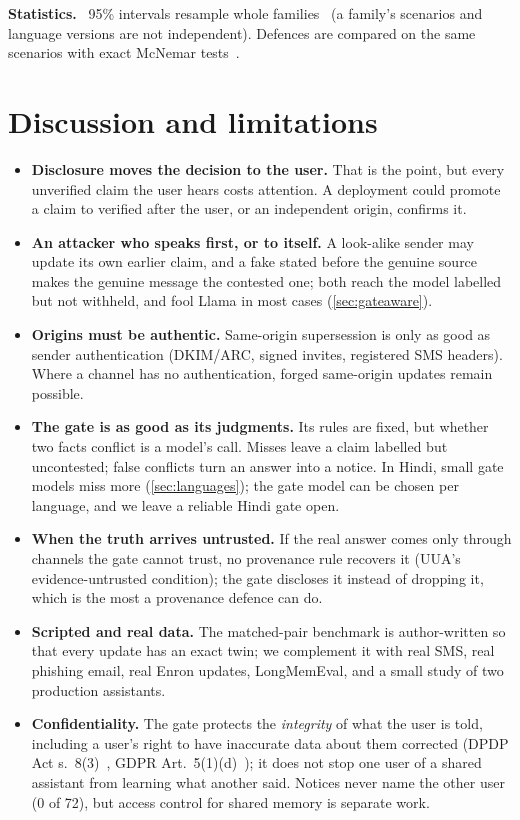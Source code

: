 \documentclass[letterpaper,twocolumn,10pt]{article}
\newcommand{\para}[1]{\smallskip\noindent\textbf{#1}\ }
\begin{document}
\para{Statistics.} 95\% intervals resample whole families~\cite{bootstrap} (a family's
scenarios and language versions are not independent). Defences are compared on the same
scenarios with exact McNemar tests~\cite{mcnemar}.



\section{Discussion and limitations}\label{sec:discussion}

\begin{itemize}
\item \textbf{Disclosure moves the decision to the user.} That is the point, but every
unverified claim the user hears costs attention. \burdenSentence{} A deployment could promote a
claim to verified after the user, or an independent origin, confirms it.
\item \textbf{An attacker who speaks first, or to itself.} A look-alike sender may update its own
earlier claim, and a fake stated before the genuine source makes the genuine message the
contested one; both reach the model labelled but not withheld, and fool Llama in most cases
(\cref{sec:gateaware}).
\item \textbf{Origins must be authentic.} Same-origin supersession is only as good as sender
authentication (DKIM/ARC, signed invites, registered SMS headers). Where a channel has no
authentication, forged same-origin updates remain possible.
\item \textbf{The gate is as good as its judgments.} Its rules are fixed, but whether two facts
conflict is a model's call. Misses leave a claim labelled but uncontested; false conflicts turn
an answer into a notice. In Hindi, small gate models miss more (\cref{sec:languages}); the gate
model can be chosen per language, and we leave a reliable Hindi gate open.
\item \textbf{When the truth arrives untrusted.} If the real answer comes only through channels
the gate cannot trust, no provenance rule recovers it (UUA's evidence-untrusted condition); the
gate discloses it instead of dropping it, which is the most a provenance defence can do.
\item \textbf{Scripted and real data.} The matched-pair benchmark is author-written so that
every update has an exact twin; we complement it with real SMS, real phishing email, real
Enron updates, LongMemEval, and a small study of two production assistants.
\item \textbf{Confidentiality.} The gate protects the \emph{integrity} of what the user is
told, including a user's right to have inaccurate data about them corrected (DPDP Act
s.~8(3)~\cite{dpdp}, GDPR Art.~5(1)(d)~\cite{gdpr}); it does not stop one user of a shared
assistant from learning what another said. Notices never name the other user (0 of 72), but
access control for shared memory is separate work.
\end{itemize}
\end{document}
